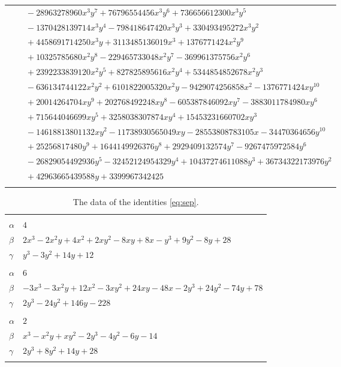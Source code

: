 \documentclass[11pt]{article}
\begin{document}
\begin{longtable}{@{}ll@{}}
 & $\quad -28963278960x^{3}y^{7}+76796554456x^{3}y^{6}+736656612300x^{3}y^{5}$\\
 & $\quad -1370428139714x^{3}y^{4}-798418647420x^{3}y^{3}+330493495272x^{3}y^{2}$\\
 & $\quad +4458691714250x^{3}y+3113485136019x^{3}+1376771424x^{2}y^{9}$\\
 & $\quad +10325785680x^{2}y^{8}-229465733048x^{2}y^{7}-369961375756x^{2}y^{6}$\\
 & $\quad +2392233839120x^{2}y^{5}+827825895616x^{2}y^{4}+5344854852678x^{2}y^{3}$\\
 & $\quad -636134744122x^{2}y^{2}+6101822005320x^{2}y-9429074256858x^{2}-1376771424xy^{10}$\\
 & $\quad +20014264704xy^{9}+202768492248xy^{8}-605387846092xy^{7}-3883011784980xy^{6}$\\
 & $\quad +715644046699xy^{5}+3258038307874xy^{4}+15453231660702xy^{3}$\\
 & $\quad -14618813801132xy^{2}-11738930565049xy-28553808783105x-34470364656y^{10}$\\
 & $\quad +25256817480y^{9}+1644149926376y^{8}+2929409132574y^{7}-9267475972584y^{6}$\\
 & $\quad -26829054492936y^{5}-32452124954329y^{4}+10437274611088y^{3}+36734322173976y^{2}$\\
 & $\quad +42963665439588y+3399967342425$\\
\addlinespace[3pt]
\end{longtable}
\endgroup

\begingroup\footnotesize
\setlength{\LTcapwidth}{\textwidth}
\begin{longtable}{@{}ll@{}}
\caption{The data of the identities \eqref{eq:sep}.}\label{tab:sep}\\
\hline\endfirsthead\hline\endhead\hline\endfoot
\multicolumn{2}{@{}l}{$\{i,j\}=\{0,1\}$, $k_{ij}=2^{2}\cdot 7^{2}$}\\
$\alpha$ & $4$\\
$\beta$ & $2x^{3}-2x^{2}y+4x^{2}+2xy^{2}-8xy+8x-y^{3}+9y^{2}-8y+28$\\
$\gamma$ & $y^{3}-3y^{2}+14y+12$\\
\addlinespace[3pt]
\multicolumn{2}{@{}l}{$\{i,j\}=\{1,3\}$, $k_{ij}=2\cdot 3\cdot 5^{2}$}\\
$\alpha$ & $6$\\
$\beta$ & $-3x^{3}-3x^{2}y+12x^{2}-3xy^{2}+24xy-48x-2y^{3}+24y^{2}-74y+78$\\
$\gamma$ & $2y^{3}-24y^{2}+146y-228$\\
\addlinespace[3pt]
\multicolumn{2}{@{}l}{$\{i,j\}=\{2,3\}$, $k_{ij}=2\cdot 5^{2}$}\\
$\alpha$ & $2$\\
$\beta$ & $x^{3}-x^{2}y+xy^{2}-2y^{3}-4y^{2}-6y-14$\\
$\gamma$ & $2y^{3}+8y^{2}+14y+28$\\
\addlinespace[3pt]
\end{longtable}
\endgroup
\end{document}
